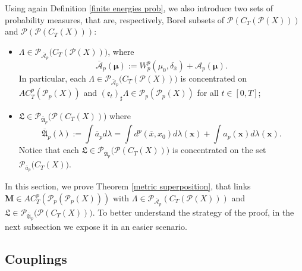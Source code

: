 \documentclass[10pt,leqno]{amsart}
\numberwithin{equation}{section}
\newcommand{\PP}{\mathcal{P}}
\begin{document}
Using again Definition \ref{finite energies prob}, we also introduce two sets of probability measures, that are, respectively, Borel subsets of $\PP(C_T(\PP(X)))$ and $\PP(\PP(C_T(X)))$:
\begin{itemize}
    \item $\Lambda \in \PP_{\bar{\mathcal{A}}_p}\big(
    C_T(\PP(X))\big)$, where 
    \begin{equation}\label{eq: ac energy on measures with initial moment}
        \bar{\mathcal{A}}_p(\boldsymbol{\mu}) := W_p^p(\mu_0, \delta_{\overline{x}}) + \mathcal{A}_p(\boldsymbol{\mu}).
    \end{equation}
    In particular, each $\Lambda \in \PP_{\bar{\mathcal{A}}_p}\big(C_T(\PP(X))\big)$ is concentrated on $AC^p_T(\PP_p(X))$ and $(\mathfrak{e}_t)_\sharp \Lambda \in \PP_p(\PP_p(X))$ for all $t\in[0,T]$;
    \item $\mathfrak{L}\in \PP_{\overline{\mathfrak{A}}_p}\big(\PP(C_T(X))\big)$ where 
    \begin{equation}\label{eq: def of mathfrak A_p}
        \overline{\mathfrak{A}}_p (\lambda):= \int \overline{a}_p d\lambda =  \int d^p(\overline{x},x_0) d\lambda(\boldsymbol{x}) + \int a_p(\boldsymbol{x})d\lambda(\boldsymbol{x}).
    \end{equation}
    Notice that each $\mathfrak{L}\in \PP_{\overline{\mathfrak{A}}_p}\big(\PP(C_T(X))\big)$ is concentrated on the set $\PP_{\overline{a}_p}\big(C_T(X)\big)$.
\end{itemize}

In this section, we prove Theorem \ref{metric superposition}, that links $\boldsymbol{M} \in AC_T^p(\PP_p(\PP_p(X)))$ with $\Lambda \in \PP_{\overline{\mathcal{A}}_p}(C_T(\PP(X)))$ and $\mathfrak{L}\in \PP_{\overline{\mathfrak{A}}_p}\big(\PP(C_T(X))\big)$. To better understand the strategy of the proof, in the next subsection we expose it in an easier scenario.




\subsection{Couplings}\label{couplings}
\end{document}
